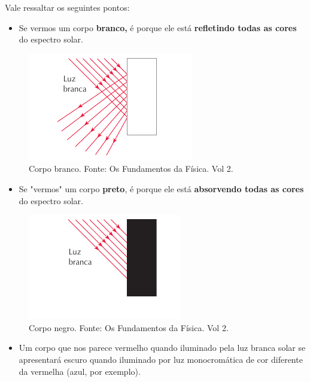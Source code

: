 \documentclass[11pt,twocolumn,oneside]{article}
\begin{document}
Vale ressaltar os seguintes pontos:


\begin{itemize}

\item Se vermos um corpo \textbf{branco,} é porque ele está \textbf{refletindo todas as cores} do espectro solar.

\end{itemize}


\begin{figure}[h]{}
\centering\includegraphics[width=2.5truein]{img11.png}
\caption{Corpo branco. Fonte: Os Fundamentos da Física. Vol 2.}
\centering
\end{figure}

\begin{itemize}

\item Se "vermos" um corpo \textbf{preto}, é porque ele está \textbf{absorvendo todas as cores} do espectro solar.

\end{itemize}


\begin{figure}[h]{}
\centering\includegraphics[width=2.5truein]{img12.png}
\caption{Corpo negro. Fonte: Os Fundamentos da Física. Vol 2.}
\centering
\end{figure}

\begin{itemize}

\item Um corpo que nos parece vermelho quando iluminado pela luz branca solar se apresentará escuro quando iluminado por luz monocromática de cor diferente da vermelha (azul, por exemplo).

\end{itemize}
\end{document}
